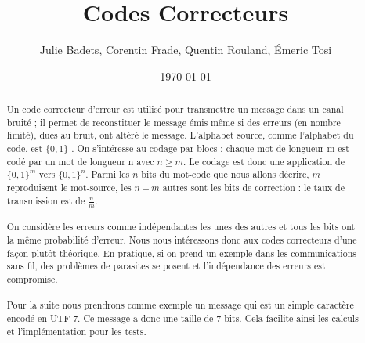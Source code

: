 \documentclass[a4paper,11pt]{report}
\title{Codes Correcteurs}
\author{Julie Badets, Corentin Frade, Quentin Rouland, Émeric Tosi}
\date{\today}
\begin{document}
    \maketitle{}

    \begin{abstract}
        \paragraph{}
Un code correcteur d'erreur est utilisé pour transmettre un message dans un canal bruité ;
il permet de reconstituer le message émis même si des erreurs (en nombre limité), dues au bruit, ont altéré le message.
L'alphabet source, comme l'alphabet du code, est $\{0,1\}$ .
On s'intéresse au codage par blocs : chaque mot de longueur m est codé par un mot de longueur n avec $n \geq m$.
Le codage est donc une application de $\{0,1\}^m$  vers $\{0,1\}^n$.
Parmi les $n$ bits du mot-code que nous allons décrire, $m$ reproduisent le mot-source,
les $n-m$ autres sont les bits de correction : le taux de transmission est de $\frac{n}{m}$.
        \paragraph{}
On considère les erreurs comme indépendantes les unes des autres et tous les bits ont la même probabilité d'erreur.
Nous nous intéressons donc aux codes correcteurs d'une façon plutôt théorique.
En pratique, si on prend un exemple dans les communications sans fil,
des problèmes de parasites se posent et l'indépendance des erreurs est compromise.
        \paragraph{}
Pour la suite nous prendrons comme exemple un message qui est un simple caractère encodé en UTF-7.
Ce message a donc une taille de 7 bits.
Cela facilite ainsi les calculs et l'implémentation pour les tests.
    \end{abstract}

    \setcounter{tocdepth}{1}

    \renewcommand{\contentsname}{Sommaire}

    \tableofcontents{}

    

    

    

    

%    

    

\end{document}
